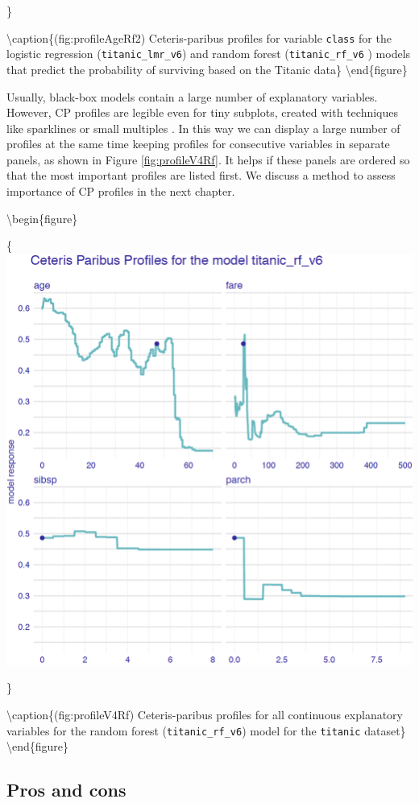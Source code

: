 \documentclass[12pt,]{krantz}
\theoremstyle{definition}
\theoremstyle{definition}
\theoremstyle{definition}
\theoremstyle{remark}
\begin{document}
\}

\textbackslash{}caption\{(fig:profileAgeRf2) Ceteris-paribus profiles
for variable \texttt{class} for the logistic regression
(\texttt{titanic\_lmr\_v6}) and random forest (\texttt{titanic\_rf\_v6}
) models that predict the probability of surviving based on the Titanic
data\}\label{fig:profileAgeRf2} \textbackslash{}end\{figure\}

Usually, black-box models contain a large number of explanatory
variables. However, CP profiles are legible even for tiny subplots,
created with techniques like sparklines or small multiples
\citep{Tufte1986}. In this way we can display a large number of profiles
at the same time keeping profiles for consecutive variables in separate
panels, as shown in Figure \ref{fig:profileV4Rf}. It helps if these
panels are ordered so that the most important profiles are listed first.
We discuss a method to assess importance of CP profiles in the next
chapter.

\textbackslash{}begin\{figure\}

\{\centering \includegraphics[width=0.7\linewidth]{figure/profile_v4_rf}

\}

\textbackslash{}caption\{(fig:profileV4Rf) Ceteris-paribus profiles for
all continuous explanatory variables for the random forest
(\texttt{titanic\_rf\_v6}) model for the \texttt{titanic}
dataset\}\label{fig:profileV4Rf} \textbackslash{}end\{figure\}

\hypertarget{pros-and-cons}{%
\subsection{Pros and cons}\label{pros-and-cons}}
\end{document}
